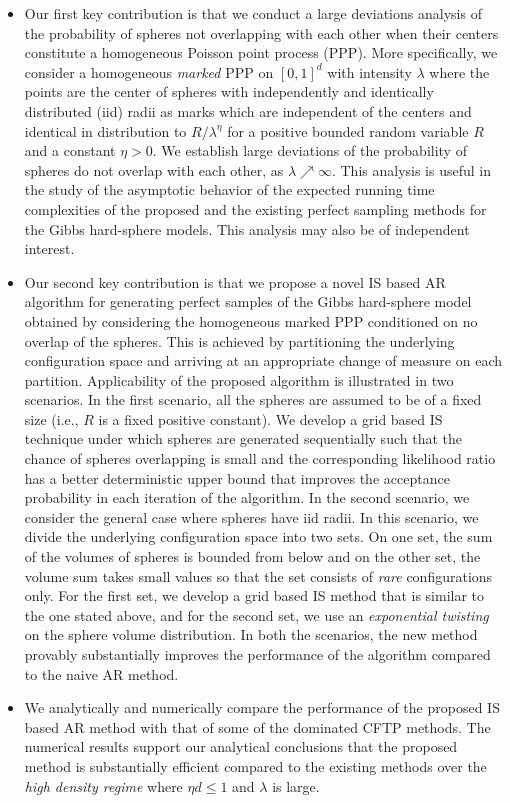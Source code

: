 \documentclass[11pt]{article}
\begin{document}
\begin{itemize}
 \item Our first key contribution is that we conduct a large deviations analysis of the probability of spheres not overlapping with each other when their centers constitute a homogeneous Poisson point process (PPP). More specifically, we consider a homogeneous {\em marked} PPP on $[0,1]^d$ with intensity $\lambda$ where the points are the center of spheres with independently and identically distributed (iid) radii as marks which are independent of the centers and identical in distribution to  $R/\lambda^\eta$ for a positive bounded random variable  $R$ and a constant ${\eta > 0}$. We establish large deviations of the probability of spheres do not overlap with each other,  as ${\lambda \nearrow \infty}$. This analysis is useful in the study of the asymptotic behavior of the expected running time complexities of the proposed and the existing perfect sampling methods for the Gibbs hard-sphere models. This analysis may also be of independent interest.
       
 \item {Our second key contribution is that we propose a novel IS based AR algorithm for generating perfect samples of the Gibbs hard-sphere model obtained by considering the homogeneous marked PPP conditioned on no overlap of the spheres. This is achieved by partitioning the underlying configuration space and arriving at an appropriate change of measure on each partition. Applicability of the proposed algorithm is illustrated  in two scenarios.
       In the first scenario, all the spheres are assumed to be of a fixed size (i.e., $R$ is a fixed positive constant). We develop a grid based IS technique under which spheres are generated sequentially such that the chance of spheres overlapping is small and the corresponding likelihood ratio has a better deterministic upper bound that improves the acceptance probability in each iteration of the algorithm.
       In the second scenario, we consider the general case where spheres have iid radii. In this scenario, we divide the underlying configuration space into two sets. On one set, the sum of the volumes of spheres is bounded from below and on the other set, the volume sum takes small values so that the set consists of  {\em rare} configurations only. For the first set, we develop a grid based IS method that is similar to the one stated above, and for the second set, we use an {\it exponential twisting} on the sphere volume distribution. In both the scenarios, the new method provably substantially improves the performance of the algorithm compared to the naive AR method.}
       
 \item We analytically and numerically compare the performance of the proposed IS based AR method with  that of some of the dominated CFTP methods.
         The numerical results support our analytical conclusions that the proposed method is substantially efficient compared to the existing methods over the {\em high density regime} where $\eta d \leq 1$ and $\lambda$ is large.
\end{itemize}
\end{document}
